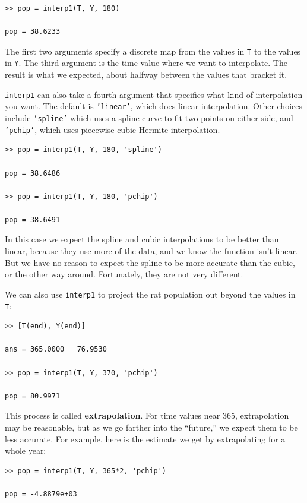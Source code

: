 \documentclass[
]{book}
\begin{document}
\begin{verbatim}
>> pop = interp1(T, Y, 180)

pop = 38.6233
\end{verbatim}

The first two arguments specify a discrete map from the values in
{\tt T} to the values in {\tt Y}.  The third argument is the
time value where we want to interpolate.  The result is what
we expected, about halfway between the values that bracket it.

{\tt interp1} can also take a fourth argument that specifies what
kind of interpolation you want.  The default is {\tt 'linear'}, which
does linear interpolation.  Other choices include {\tt 'spline'}
which uses a spline curve to fit two points on either side,
and {\tt 'pchip'}, which uses piecewise cubic Hermite interpolation.

\begin{verbatim}
>> pop = interp1(T, Y, 180, 'spline')

pop = 38.6486

>> pop = interp1(T, Y, 180, 'pchip')

pop = 38.6491
\end{verbatim}

In this case we expect the spline and cubic interpolations to be
better than linear, because they use more of the data, and we know the
function isn't linear.  But we have no reason to expect the spline to
be more accurate than the cubic, or the other way around.
Fortunately, they are not very different.

We can also use {\tt interp1} to project the rat population out
beyond the values in {\tt T}:

\begin{verbatim}
>> [T(end), Y(end)]

ans = 365.0000   76.9530

>> pop = interp1(T, Y, 370, 'pchip')

pop = 80.9971
\end{verbatim}

This process is called {\bf extrapolation}.  For time values near
365, extrapolation may be reasonable, but as we go farther into
the ``future,'' we expect them to be less accurate.
For example, here is the estimate we get by extrapolating for a whole
year:

\begin{verbatim}
>> pop = interp1(T, Y, 365*2, 'pchip')

pop = -4.8879e+03
\end{verbatim}
\end{document}
